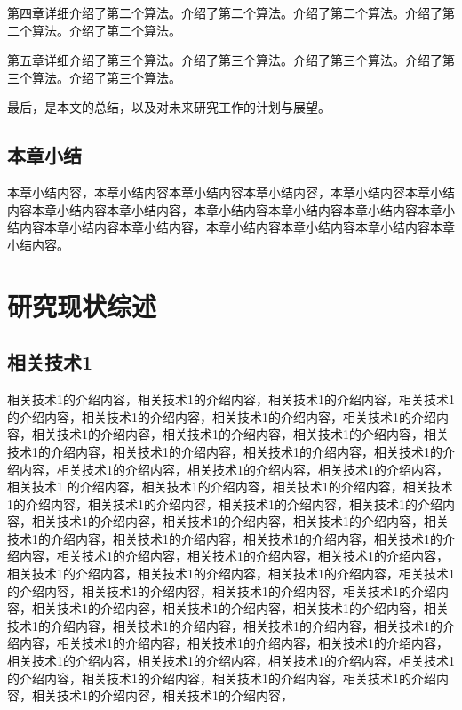 \documentclass[unicode,pdfcover]{hquthesis}
\begin{document}
第四章详细介绍了第二个算法。介绍了第二个算法。介绍了第二个算法。介绍了第二个算法。介绍了第二个算法。

第五章详细介绍了第三个算法。介绍了第三个算法。介绍了第三个算法。介绍了第三个算法。介绍了第三个算法。

最后，是本文的总结，以及对未来研究工作的计划与展望。



\section{本章小结}

本章小结内容，本章小结内容本章小结内容本章小结内容，本章小结内容本章小结内容本章小结内容本章小结内容，本章小结内容本章小结内容本章小结内容本章小结内容本章小结内容本章小结内容，本章小结内容本章小结内容本章小结内容本章小结内容。


\chapter{研究现状综述}
\section{相关技术1}

相关技术1的介绍内容，相关技术1的介绍内容，相关技术1的介绍内容，相关技术1的介绍内容，相关技术1的介绍内容，相关技术1的介绍内容，相关技术1的介绍内容，相关技术1的介绍内容，相关技术1的介绍内容，相关技术1的介绍内容，相关技术1的介绍内容，相关技术1的介绍内容，相关技术1的介绍内容，相关技术1的介绍内容，相关技术1的介绍内容，相关技术1的介绍内容，相关技术1的介绍内容，相关技术1 的介绍内容，相关技术1的介绍内容，相关技术1的介绍内容，相关技术1的介绍内容，相关技术1的介绍内容，相关技术1的介绍内容，相关技术1的介绍内容，相关技术1的介绍内容，相关技术1的介绍内容，相关技术1的介绍内容，相关技术1的介绍内容，相关技术1的介绍内容，相关技术1的介绍内容，相关技术1的介绍内容，相关技术1的介绍内容，相关技术1的介绍内容，相关技术1的介绍内容，相关技术1的介绍内容，相关技术1的介绍内容，相关技术1的介绍内容，相关技术1的介绍内容，相关技术1的介绍内容，相关技术1的介绍内容，相关技术1的介绍内容，相关技术1的介绍内容，相关技术1的介绍内容，相关技术1的介绍内容，相关技术1的介绍内容，相关技术1的介绍内容，相关技术1的介绍内容，相关技术1的介绍内容，相关技术1的介绍内容，相关技术1的介绍内容，相关技术1的介绍内容，相关技术1的介绍内容，相关技术1的介绍内容，相关技术1的介绍内容，相关技术1的介绍内容，相关技术1的介绍内容，相关技术1的介绍内容，相关技术1的介绍内容，相关技术1的介绍内容，相关技术1的介绍内容，
\end{document}
